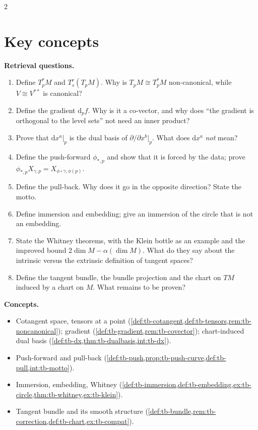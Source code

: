 \begin{paracol}{2}
\section*{Key concepts}
\begin{keyconcepts}
\textbf{Retrieval questions.}
\begin{enumerate}
  \item Define $T^*_pM$ and $T^r_s(T_pM)$. Why is $T_pM\cong T^*_pM$ non-canonical, while $V\cong V^{**}$ is canonical?
  \item Define the gradient $\mathrm d_pf$. Why is it a co-vector, and why does ``the gradient is orthogonal to the level sets'' not need an inner product?
  \item Prove that $\mathrm dx^a|_p$ is the dual basis of $\partial/\partial x^b|_p$. What does $\mathrm dx^a$ \emph{not} mean?
  \item Define the push-forward $\phi_{*,p}$ and show that it is forced by the data; prove $\phi_{*,p}X_{\gamma,p}=X_{\phi\circ\gamma,\phi(p)}$.
  \item Define the pull-back. Why does it go in the opposite direction? State the motto.
  \item Define immersion and embedding; give an immersion of the circle that is not an embedding.
  \item State the Whitney theorems, with the Klein bottle as an example and the improved bound $2\dim M-\alpha(\dim M)$. What do they say about the intrinsic versus the extrinsic definition of tangent spaces?
  \item Define the tangent bundle, the bundle projection and the chart on $TM$ induced by a chart on $M$. What remains to be proven?
\end{enumerate}
\textbf{Concepts.}
\begin{itemize}
  \item Cotangent space, tensors at a point (\cref{def:tb-cotangent,def:tb-tensors,rem:tb-noncanonical}); gradient (\cref{def:tb-gradient,rem:tb-covector}); chart-induced dual basis (\cref{def:tb-dx,thm:tb-dualbasis,int:tb-dx}).
  \item Push-forward and pull-back (\cref{def:tb-push,prop:tb-push-curve,def:tb-pull,int:tb-motto}).
  \item Immersion, embedding, Whitney (\cref{def:tb-immersion,def:tb-embedding,ex:tb-circle,thm:tb-whitney,ex:tb-klein}).
  \item Tangent bundle and its smooth structure (\cref{def:tb-bundle,rem:tb-correction,def:tb-chart,ex:tb-compat}).
\end{itemize}
\end{keyconcepts}

\flushside
\end{paracol}

